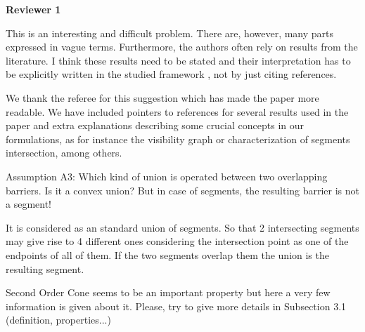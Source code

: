 \documentclass{article}
\newenvironment{reviewer}{\setcounter{pointcounter}{1}}{}
\newcommand{\point}{\text{{\selectfont \thepointcounter} \stepcounter{pointcounter}}}
\begin{document}
	\begin{reviewer}
		
		\begin{tcolorbox}[breakable,enhanced,coltitle=black,colback=red!75!black,colframe=red!75!black,borderline={1pt}{0pt}{black},boxrule=0pt]
			\textbf{Reviewer 1}
		\end{tcolorbox}
		
		\begin{itshape}
			This is an interesting and difficult problem. There are, however, many parts
			expressed in vague terms. Furthermore, the authors often rely on results from the
			literature. I think these results need to be stated and their interpretation has to be
			explicitly written in the studied framework , not by just citing references.
		\end{itshape}
		
		\begin{tcolorbox}[breakable,enhanced,coltitle=black,colback=red!5!white,colframe=red!75!black,title=\textbf{Answer R1.\point},borderline={1pt}{0pt}{black},boxrule=0pt]
		We thank the referee for this suggestion which has made the paper more readable. We have included pointers to references for several results used in the paper and extra explanations describing some crucial concepts in our formulations, as for instance the visibility graph or characterization of segments intersection, among others.

		\end{tcolorbox}
		
		\begin{itshape}
			Assumption A3: Which kind of union is operated between two overlapping barriers. Is it a convex union? But in case of segments, the resulting barrier is not a segment!
		\end{itshape}
		
		\begin{tcolorbox}[breakable,enhanced,coltitle=black,colback=red!5!white,colframe=red!75!black,title=\textbf{Answer R1.\point},borderline={1pt}{0pt}{black},boxrule=0pt]
		It is considered as an standard union of segments. So that 2 intersecting segments may give rise to 4 different ones considering the intersection point as one of the  endpoints of all of them. If the two segments overlap them the union is the resulting segment.
		\end{tcolorbox}
		
		\begin{itshape}
			Second Order Cone seems to be an important property but here a very few information is given about it. Please, try to give more details in Subsection 3.1 (definition, properties...)
		\end{itshape}
		

\end{reviewer}
\end{document}
